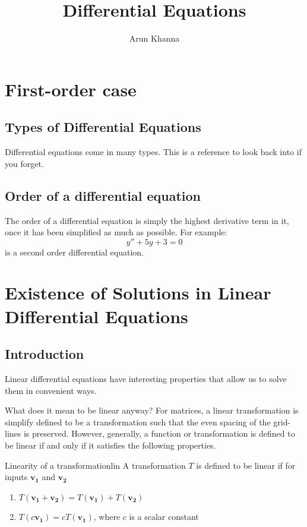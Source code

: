 \documentclass{report}
\title{Differential Equations}
\author{Arun Khanna}
\date{}
\begin{document}
\maketitle
\tableofcontents

\chapter{First-order case}
\section{Types of Differential Equations}
Differential equations come in many types. This is a reference to look back into if you forget.
\section{Order of a differential equation}
The order of a differential equation is simply the highest derivative term in it, once it has been simplified as much as possible. For example:
$$y'' + 5y + 3 = 0$$
is a second order differential equation.

\section{}



\chapter{Existence of Solutions in Linear Differential Equations}
\section{Introduction}
Linear differential equations have interesting properties that allow us to solve them in convenient ways.

What does it mean to be linear anyway? For matrices, a linear transformation is simplify defined to be a transformation such that the even spacing of the grid-lines is preserved. However, generally, a function or transformation is defined to be linear if and only if it satisfies the following properties.

\begin{mytheo}{Linearity of a transformation}{lin}
    A transformation $T$ is defined to be linear if for inputs $\mathbf{v_1}$ and $\mathbf{v_2}$
    \begin{enumerate}
        \item $T(\mathbf{v_1}+\mathbf{v_2}) = T(\mathbf{v_1}) + T(\mathbf{v_2})$
        \item $T(c\mathbf{v_1}) = cT(\mathbf{v_1})$, where $c$ is a scalar constant
   \end{enumerate}
\end{mytheo}
\end{document}
